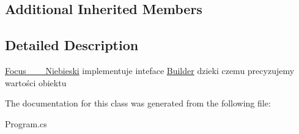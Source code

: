 \subsection*{Additional Inherited Members}


\subsection{Detailed Description}
\hyperlink{class_builder_1_1_program_1_1_focus__2__0___niebieski}{Focus\+\_\+\_\+\_\+\+Niebieski} implementuje inteface \hyperlink{class_builder_1_1_program_1_1_builder}{Builder} dzieki czemu precyzujemy wartości obiektu 



The documentation for this class was generated from the following file\+:\begin{DoxyCompactItemize}
\item 
Program.\+cs\end{DoxyCompactItemize}
